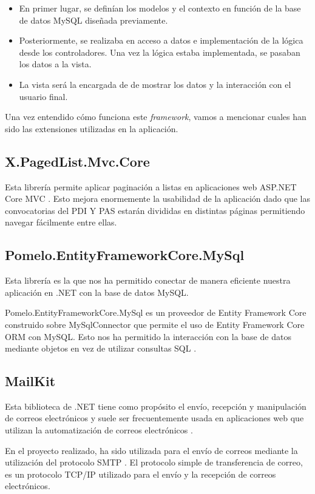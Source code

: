 \begin{itemize}
    \item En primer lugar, se definían los modelos y el contexto en función de la base de datos MySQL diseñada previamente.
    \item Posteriormente, se realizaba en acceso a datos e implementación de la lógica desde los controladores. Una vez la lógica estaba implementada, se pasaban los datos a la vista.
    \item La vista será la encargada de de mostrar los datos y la interacción con el usuario final.
\end{itemize}

Una vez entendido cómo funciona este \textit{framework}, vamos a mencionar cuales han sido las extensiones utilizadas en la aplicación.

\subsection{X.PagedList.Mvc.Core}
Esta librería permite aplicar paginación a listas en aplicaciones web ASP.NET Core MVC \cite{pagedlist:latex}.
Esto mejora enormemente la usabilidad de la aplicación dado que las convocatorias del PDI Y PAS estarán divididas en distintas páginas permitiendo navegar fácilmente entre ellas.


\subsection{Pomelo.EntityFrameworkCore.MySql}
Esta librería es la que nos ha permitido conectar de manera eficiente nuestra aplicación en .NET con la base de datos MySQL.

Pomelo.EntityFrameworkCore.MySql es un proveedor de Entity Framework Core construido sobre MySqlConnector que permite el uso de Entity Framework Core ORM con MySQL. Esto nos ha permitido la interacción con la base de datos mediante objetos en vez de utilizar consultas SQL \cite{pomelomysql:latex}. 

\subsection{MailKit}
Esta biblioteca de .NET tiene como propósito el envío, recepción y manipulación de correos electrónicos y suele ser frecuentemente usada en aplicaciones web que utilizan la automatización de correos electrónicos \cite{mailkit:latex}.

En el proyecto realizado, ha sido utilizada para el envío de correos mediante la utilización del protocolo SMTP \cite{smtp:latex}. El protocolo simple de transferencia de correo, es un protocolo TCP/IP utilizado para el envío y la recepción de correos electrónicos.

